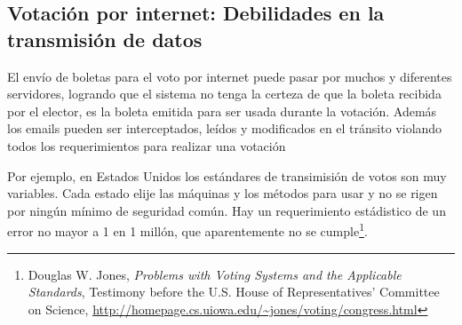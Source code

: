 \subsection{Votación por internet: Debilidades en la transmisión de datos}
El envío de boletas para el voto por internet puede pasar por muchos y diferentes servidores, logrando que el sistema no tenga la certeza de que la boleta recibida por el elector, es la boleta emitida para ser usada durante la votación. Además los emails pueden ser interceptados, leídos y modificados en el tránsito violando todos los requerimientos para realizar una votación

Por ejemplo, en Estados Unidos los estándares de transimisión de votos son muy variables. Cada estado elije las máquinas y los métodos para usar y no se rigen por ningún mínimo de seguridad común. Hay un requerimiento estádistico de un error no mayor a 1 en 1 millón, que aparentemente no se cumple\footnote{Douglas W. Jones, \textit{Problems with Voting Systems and the Applicable Standards}, Testimony before the U.S. House of Representatives' Committee on Science, \url{http://homepage.cs.uiowa.edu/~jones/voting/congress.html}}.

